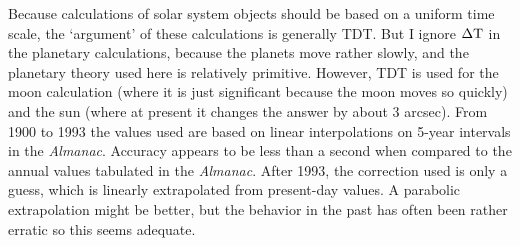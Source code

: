 Because calculations of 
solar system objects should be based on a uniform time scale, the
`argument' of these calculations is generally TDT.  But I ignore
$\rm \Delta T$ in the planetary calculations, because the
planets move rather slowly, and the planetary theory used here
is relatively primitive.  However, TDT is used for the moon calculation
(where it is just significant because the moon moves so quickly) 
and the sun (where at present it changes the answer by about 3 arcsec).
From 1900 to 
1993 the values used are based on linear interpolations on 5-year
intervals in the {\it Almanac}.  Accuracy appears to be
less than a second when compared to the annual values tabulated 
in the {\it Almanac}.  After 1993, the correction used is
only a guess, which 
is linearly extrapolated from present-day values.  A parabolic
extrapolation might be better, but the behavior in the past has
often been rather erratic so this seems adequate.

